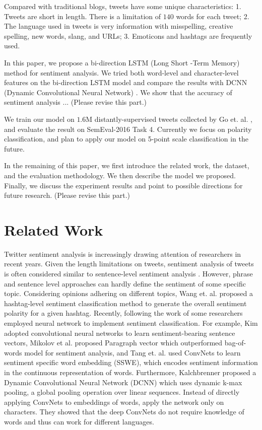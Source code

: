 \documentclass{article} %
\begin{document}
Compared with traditional blogs, tweets have some unique characteristics: 1. Tweets are short in length. There is a limitation of $140$ words for each tweet; 2. The language used in tweets is very information with misspelling, creative spelling,  new words, slang, and URLs; 3. Emoticons and hashtags are frequently used.

In this paper, we propose a bi-direction LSTM (Long Short -Term Memory)\cite{hochreiter1997long} method for sentiment analysis. We tried both word-level and character-level features on the bi-direction LSTM model and compare the results with DCNN (Dynamic Convolutional Neural Network) \cite{kalchbrenner2014convolutional}.
We show that the accuracy of sentiment analysis ... (Please revise this part.)

We train our model on $1.6$M distantly-supervised tweets collected by Go et. al. \cite{go2009twitter}, and evaluate the result on SemEval-2016 Task 4. Currently we focus on polarity classification, and plan to apply our model on 5-point scale classification in the future. 

In the remaining of this paper, we first introduce the related work, the dataset, and the evaluation methodology. We then describe the model we proposed. Finally, we discuss the experiment results and point to possible directions for future research. (Please revise this part.)

\section{Related Work}
Twitter sentiment analysis is increasingly drawing attention of researchers in recent years. 
Given the length limitations on tweets, sentiment analysis of tweets is often considered similar to sentence-level sentiment analysis \cite{kouloumpis2011twitter}.
However, phrase and sentence level approaches can hardly define the sentiment of some specific topic. Considering opinions adhering on different topics, Wang et. al.\cite{wang2011topic} proposed a hashtag-level sentiment classification method  to generate the overall sentiment polarity for a given hashtag.
Recently, following the work of \cite{mikolov2013efficient} some researchers employed neural network to implement sentiment classification. 
For example, Kim \cite{kim2014convolutional} adopted convolutional neural networks to learn sentiment-bearing sentence vectors, Mikolov et al.\cite{mikolov2013distributed} proposed Paragraph vector which outperformed bag-of-words model for sentiment analysis, and Tang et. al. \cite{tang2014learning} used ConvNets to learn sentiment specific word embedding (SSWE), which encodes sentiment information in the continuous
representation of words.
Furthermore, Kalchbrenner \cite{kalchbrenner2014convolutional} proposed a Dynamic Convolutional Neural Network (DCNN) which uses dynamic k-max pooling, a global pooling operation over linear sequences.
Instead of directly applying ConvNets to embeddings of words, \cite{zhang2015character} apply the network only on characters. They showed that the deep ConvNets do not require knowledge of words and thus can work for different languages.
\end{document}
